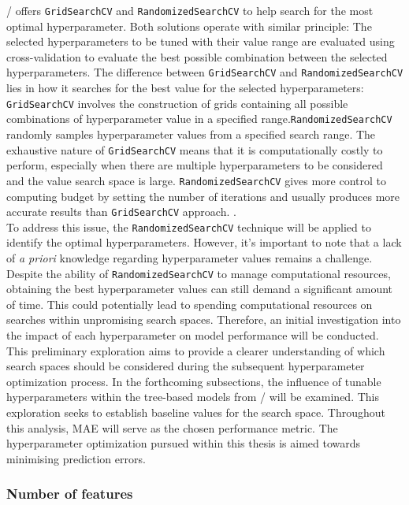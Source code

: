 \scikit/ offers {\tt GridSearchCV} and {\tt RandomizedSearchCV} to help search for the most optimal hyperparameter. Both solutions operate with similar principle: The selected hyperparameters to be tuned with their value range are evaluated using cross-validation to evaluate the best possible combination between the selected hyperparameters. The difference between {\tt GridSearchCV} and {\tt RandomizedSearchCV} lies in how it searches for the best value for the selected hyperparameters: {\tt GridSearchCV} involves the construction of grids containing all possible combinations of hyperparameter value in a specified range.{\tt RandomizedSearchCV} randomly samples hyperparameter values from a specified search range. The exhaustive nature of {\tt GridSearchCV} means that it is computationally costly to perform, especially when there are multiple hyperparameters to be considered and the value search space is large. {\tt RandomizedSearchCV} gives more control to computing budget by setting the number of iterations and usually produces more accurate results than {\tt GridSearchCV} approach. . \\

To address this issue, the {\tt RandomizedSearchCV} technique will be applied to identify the optimal hyperparameters. However, it's important to note that a lack of \emph{a priori} knowledge regarding hyperparameter values remains a challenge. Despite the ability of {\tt RandomizedSearchCV} to manage computational resources, obtaining the best hyperparameter values can still demand a significant amount of time. This could potentially lead to spending computational resources on searches within unpromising search spaces. Therefore, an initial investigation into the impact of each hyperparameter on model performance will be conducted. This preliminary exploration aims to provide a clearer understanding of which search spaces should be considered during the subsequent hyperparameter optimization process. In the forthcoming subsections, the influence of tunable hyperparameters within the tree-based models from \scikit/ will be examined. This exploration seeks to establish baseline values for the search space. Throughout this analysis, MAE will serve as the chosen performance metric. The hyperparameter optimization pursued within this thesis is aimed towards minimising prediction errors.\\

\subsubsection*{Number of features}\label{sec:max_features}

